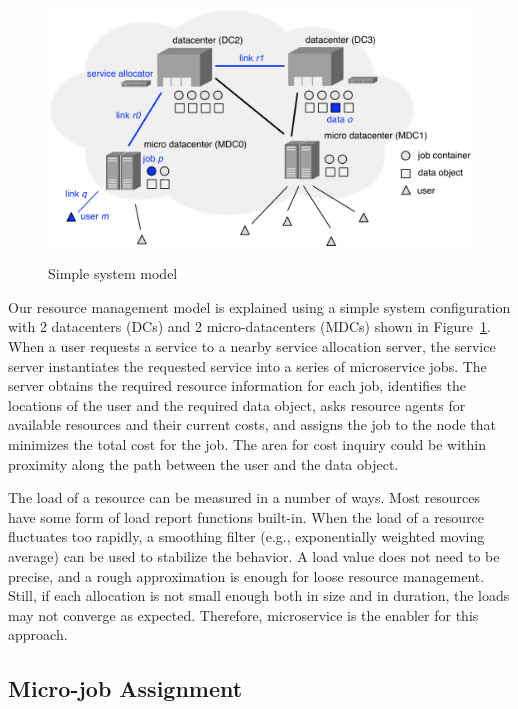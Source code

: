 
\begin{figure}[tb]
  \begin{center}
    \includegraphics[width=1.0\columnwidth]{system.pdf}
    \vspace{-2.0ex}
    \caption{Simple system model}
    \label{fig:system}
  \end{center}
\end{figure}

Our resource management model is explained using a simple system
configuration with 2 datacenters (DCs) and 2 micro-datacenters (MDCs)
shown in Figure~\ref{fig:system}.
When a user requests a service to a nearby service allocation server,
the service server instantiates the requested service into a series of
microservice jobs.
The server obtains the required resource information for each job,
identifies the locations of the user and the required data object,
asks resource agents for available resources and their current costs,
and assigns the job to the node that minimizes the total cost for the
job.
The area for cost inquiry could be within proximity along the path
between the user and the data object.

The load of a resource can be measured in a number of ways.  Most
resources have some form of load report functions built-in.
When the load of a resource fluctuates too rapidly,
a smoothing filter (e.g., exponentially weighted moving average)
can be used to stabilize the behavior.
A load value does not need to be precise, and a rough approximation is
enough for loose resource management.
Still, if each allocation is not small enough both in size and in
duration, the loads may not converge as expected.
Therefore, microservice is the enabler for this approach.

\subsection{Micro-job Assignment}

